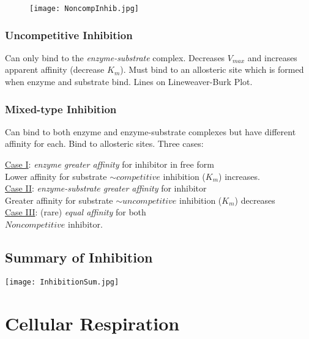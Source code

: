 \documentclass[../Bio_chemistryReview.tex]{subfiles}
\begin{document}
\begin{figure}[h]
  \centering
  \texttt{[image: NoncompInhib.jpg]}
\end{figure}

\subsubsection{Uncompetitive Inhibition}

Can only bind to the \emph{enzyme-substrate} complex. Decreases $ V_{max} $ and
increases apparent affinity (decrease $ K_{m} $). Must bind to an allosteric
site which is formed when enzyme and substrate bind. Lines on Lineweaver-Burk
Plot. 

\subsubsection{Mixed-type Inhibition\supddag}

Can bind to both enzyme and enzyme-substrate complexes but have different
affinity for each. Bind to allosteric sites. Three cases: 
\begin{infobox}
  \underline{Case I}: \emph{enzyme greater affinity} for inhibitor in free
  form\\
  Lower affinity for substrate $ \boxed{ \sim  competitive}$ inhibition
  ($ K_{m} $) increases.\\
  \underline{Case II}: \emph{enzyme-substrate greater affinity} for inhibitor\\
  Greater affinity for substrate  $\boxed{\sim  uncompetitive}$ inhibition ($
  K_{m} $) decreases\\
  \underline{Case III}: (rare) \emph{equal affinity} for both\\
  $ \boxed{Noncompetitive} $ inhibitor.
\end{infobox}

\subsection{Summary of Inhibition}

\begin{center}
  \texttt{[image: InhibitionSum.jpg]}
\end{center}

\section{Cellular Respiration}
\end{document}
